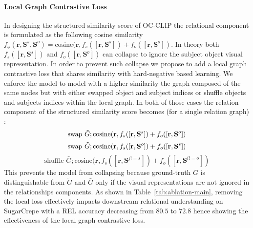 \paragraph{Local Graph Contrastive Loss} In designing the structured similarity score of OC-CLIP the relational component is formulated as the following cosine similarity $f_\phi(\mathbf{r}, \mathbf{S}^s, \mathbf{S}^o) = \text{cosine}(\mathbf{r}, f_s([\mathbf{r}, \mathbf{S}^s]) + f_o([\mathbf{r}, \mathbf{S}^o])$. In theory both $f_s([\mathbf{r}, \mathbf{S}^s]) $ and  $f_o([\mathbf{r}, \mathbf{S}^o]) $  can collapse to ignore the subject  object visual representation. In order to prevent such collapse we propose to add a local graph contrastive loss that shares similarity with hard-negative based learning. We enforce the model to model with a higher similarity the graph composed of the same nodes but with either swapped object and subject indices or shuffle objects and subjects indices within the local graph. In both of those cases the relation component of the structured similarity score becomes (for a single relation graph) : 
\begin{equation}
    \text{swap } \tilde{G}; \text{cosine}(\mathbf{r}, f_s([\mathbf{r}, \mathbf{S}^s]) + f_o([\mathbf{r}, \mathbf{S}^o])\\
\end{equation}
\begin{equation}
    \text{swap } \tilde{G}; \text{cosine}(\mathbf{r}, f_s([\mathbf{r}, \mathbf{S}^o]) + f_o([\mathbf{r}, \mathbf{S}^s])\\
\end{equation}
\begin{equation}
     \text{shuffle } \bar{G} ; \text{cosine}(\mathbf{r}, f_s([\mathbf{r}, \mathbf{S}^{j!=s}]) + f_o([\mathbf{r}, \mathbf{S}^{i!=o}])
\end{equation}
This prevents the model from collapsing because  ground-truth $G$ is distinguishable from $\tilde{G}$ and $\bar{G}$ only if the visual representations are not ignored in the relationships components.
As shown in Table~\ref{tab:ablation-main}, removing the local loss effectively impacts downstream relational understanding on SugarCrepe with a REL accuracy decreasing from $80.5$ to $72.8$ hence showing the effectiveness of the local graph contrastive loss.

